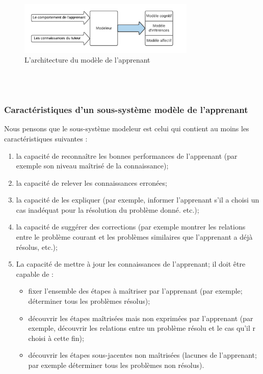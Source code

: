 \begin{figure}
    \centering
    \includegraphics[width=0.75\textwidth]{figures/md_inf.png}
    \captionsetup{justification=centering}
    \caption{ L'architecture du modèle de l'apprenant }
 \label{fig:2}
\end{figure}
\\\


\subsubsection{Caractéristiques d'un sous-système modèle de l'apprenant }
Nous pensons que le sous-système modeleur est celui qui contient au moins les
caractéristiques suivantes :

\begin{enumerate}
\item la capacité de reconnaître les bonnes performances de l'apprenant (par exemple son niveau maîtrisé de la connaissance);
\item la capacité de relever les connaissances erronées;
\item la capacité de les expliquer (par exemple, informer l'apprenant s'il a choisi un cas inadéquat pour la résolution du problème donné. etc.);
\item  la capacité de suggérer des corrections (par exemple montrer les relations entre le problème courant et les problèmes similaires que l'apprenant a déjà résolus, etc.);
\item La capacité de mettre à jour les connaissances de l'apprenant; il doit être capable de  : \begin{itemize}
\item fixer l'ensemble des étapes à maîtriser par l'apprenant (par exemple; déterminer
tous les problèmes résolus);
\item découvrir les étapes maîtrisées mais non exprimées par l'apprenant (par exemple, découvrir les relations entre un problème résolu et le cas qu'il r choisi à cette fin);
\item découvrir les étapes sous-jacentes non maîtrisées (lacunes de l'apprenant; par exemple déterminer tous les problèmes non résolus).
\end{itemize}
\end{enumerate}


